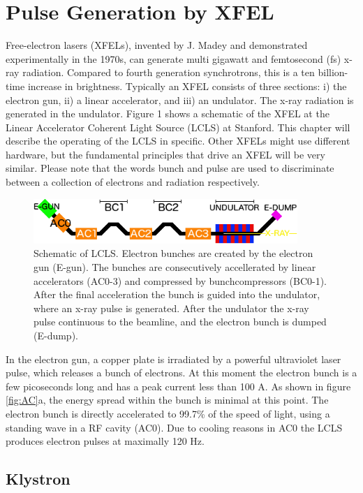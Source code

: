 \chapter{Pulse Generation by XFEL}
Free-electron lasers (XFELs), invented by J. Madey and demonstrated experimentally in the 1970s, can generate multi gigawatt and femtosecond (fs) x-ray radiation. Compared to fourth generation synchrotrons, this is a ten billion-time increase in brightness. Typically an XFEL consists of three sections: i) the electron gun, ii) a linear accelerator, and iii) an undulator. The x-ray radiation is generated in the undulator. Figure 1 shows a schematic of the XFEL at the Linear Accelerator Coherent Light Source (LCLS) at Stanford. This chapter will describe the operating of the LCLS in specific. Other XFELs might use different hardware, but the fundamental principles that drive an XFEL will be very similar. Please note that the words bunch and pulse are used to discriminate between a collection of electrons and radiation respectively.

\begin{figure}[h]\label{fig:LCLS}
\centering
\includegraphics[width=100mm]{LCLS_schematic.png}
\caption{Schematic of LCLS. Electron bunches are created by the electron gun (E-gun). The bunches are consecutively accellerated by linear accelerators (AC0-3) and compressed by bunchcompressors (BC0-1). After the final acceleration the bunch is guided into the undulator, where an x-ray pulse is generated. After the undulator the x-ray pulse continuous to the beamline, and the electron bunch is dumped (E-dump).}
\end{figure}

In the electron gun, a copper plate is irradiated by a powerful ultraviolet laser pulse, which releases a bunch of electrons. At this moment the electron bunch is a few picoseconds long and has a peak current less than 100 A. As shown in figure \ref{fig:AC}a, the energy spread within the bunch is minimal at this point. The electron bunch is directly accelerated to 99.7\% of the speed of light, using a standing wave in a RF cavity (AC0). Due to cooling reasons in AC0 the LCLS produces electron pulses at maximally 120 Hz. 

\section{Klystron}

